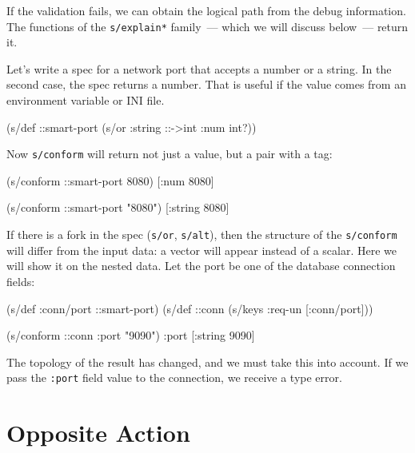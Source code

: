
If the validation fails, we can obtain the logical path from the debug information. The functions of the \verb|s/explain*| family~--- which we will discuss below~--- return it.

Let's write a spec for a network port that accepts a number or a string. In the second case, the spec returns a number. That is useful if the value comes from an environment variable or INI file.

\begin{english}
  \begin{clojure}
(s/def ::smart-port
  (s/or :string ::->int :num int?))
  \end{clojure}
\end{english}

\noindent
Now \verb|s/conform| will return not just a value, but a pair with a tag:

\begin{english}
  \begin{clojure}
(s/conform ::smart-port 8080)
[:num 8080]

(s/conform ::smart-port "8080")
[:string 8080]
  \end{clojure}
\end{english}


If there is a fork in the spec (\verb|s/or|, \verb|s/alt|), then the structure of the \verb|s/conform| will differ from the input data: a vector will appear instead of a scalar. Here we will show it on the nested data. Let the port be one of the database connection fields:

\begin{english}
  \begin{clojure}
(s/def :conn/port ::smart-port)
(s/def ::conn
  (s/keys :req-un [:conn/port]))

(s/conform ::conn {:port "9090"})
{:port [:string 9090]}
  \end{clojure}
\end{english}

The topology of the result has changed, and we must take this into account. If we pass the \verb|:port| field value to the connection, we receive a type error.

\section{Opposite Action}


